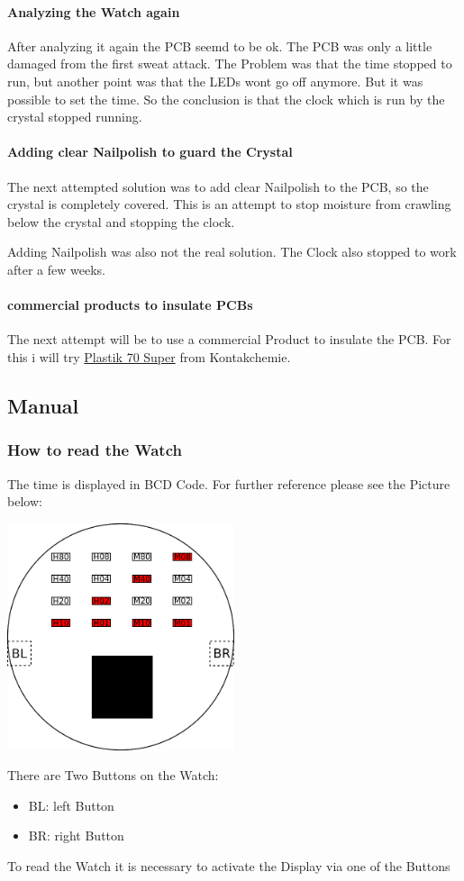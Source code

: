 \paragraph{Analyzing the Watch again}
After analyzing it again the PCB seemd to be ok. The PCB was only a little damaged from the first sweat attack.
The Problem was that the time stopped to run, but another point was that the LEDs wont go off anymore. 
But it was possible to set the time. 
So the conclusion is that the clock which is run by the crystal stopped running.
\paragraph{Adding clear Nailpolish to guard the Crystal}
The next attempted solution was to add clear Nailpolish to the PCB, so the crystal is completely covered. This is an attempt to stop moisture from crawling below the crystal and stopping the clock.

Adding Nailpolish was also not the real solution. The Clock also stopped to work after a few weeks.

\paragraph{commercial products to insulate PCBs}
The next attempt will be to use a commercial Product to insulate the PCB.
For this i will try \href{https://www.reichelt.de/korrosionsschutzlack-plastik-70-super-400-ml-isolierlack-kontakt-32046-p125737.html}{Plastik 70 Super} from Kontakchemie.


\subsection{Manual}
\subsubsection{How to read the Watch}
The time is displayed in BCD Code. For further reference please see the Picture below:
\begin{center}
  \includegraphics[width=0.5\textwidth]{drawings/BinDia1359.png}
\label{fig:BinWatchFace}
\end{center}
There are Two Buttons on the Watch:
\begin{itemize}
	\item BL: left Button
	\item BR: right Button
\end{itemize}
To read the Watch it is necessary to activate the Display via one of the Buttons


